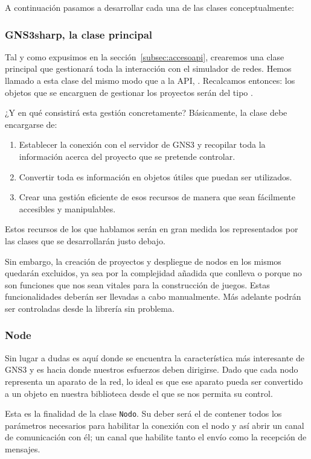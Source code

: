 A continuación pasamos a desarrollar cada una de las clases conceptualmente:

\subsubsection[''La clase principal'']{GNS3sharp, la clase principal}
Tal y como expusimos en la sección~\ref{subsec:accesoapi}, crearemos una clase principal que gestionará toda la interacción con el simulador de redes. Hemos llamado a esta clase del mismo modo que a la API, \GNSCS. Recalcamos entonces: los objetos que se encarguen de gestionar los proyectos serán del tipo \GNSCS.

¿Y en qué consistirá esta gestión concretamente? Básicamente, la clase debe encargarse de:
\begin{enumerate}
\item Establecer la conexión con el servidor de GNS3 y recopilar toda la información acerca del proyecto que se pretende controlar.
\item Convertir toda es información en objetos útiles que puedan ser utilizados.
\item Crear una gestión eficiente de esos recursos de manera que sean fácilmente accesibles y manipulables.
\end{enumerate}

Estos recursos de los que hablamos serán en gran medida los representados por las clases que se desarrollarán justo debajo.

Sin embargo, la creación de proyectos y despliegue de nodos en los mismos quedarán excluidos, ya sea por la complejidad añadida que conlleva o porque no son funciones que nos sean vitales para la construcción de juegos. Estas funcionalidades deberán ser llevadas a cabo manualmente. Más adelante podrán ser controladas desde la librería sin problema.

\subsubsection{Node}
Sin lugar a dudas es aquí donde se encuentra la característica más interesante de GNS3 y es hacia donde nuestros esfuerzos deben dirigirse. Dado que cada nodo representa un aparato de la red, lo ideal es que ese aparato pueda ser convertido a un objeto en nuestra biblioteca desde el que se nos permita su control. 

Esta es la finalidad de la clase \texttt{Nodo}. Su deber será el de contener todos los parámetros necesarios para habilitar la conexión con el nodo y así abrir un canal de comunicación con él; un canal que habilite tanto el envío como la recepción de mensajes.

